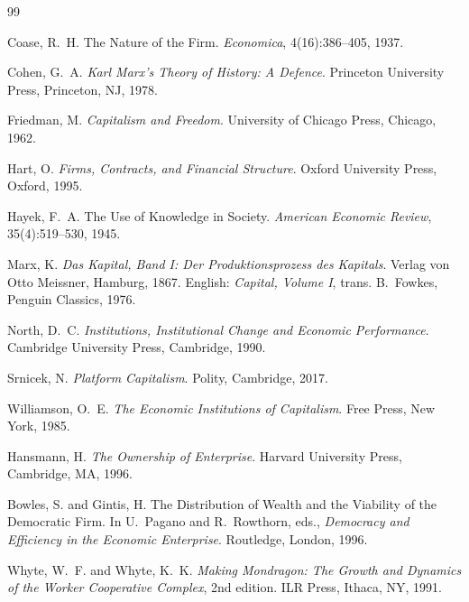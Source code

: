 \documentclass[11pt,a4paper]{article}
\theoremstyle{remark}
\begin{document}
\begin{thebibliography}{99}

Coase, R.~H.
\newblock The Nature of the Firm.
\newblock \emph{Economica}, 4(16):386--405, 1937.

Cohen, G.~A.
\newblock \emph{Karl Marx's Theory of History: A Defence}.
\newblock Princeton University Press, Princeton, NJ, 1978.

Friedman, M.
\newblock \emph{Capitalism and Freedom}.
\newblock University of Chicago Press, Chicago, 1962.

Hart, O.
\newblock \emph{Firms, Contracts, and Financial Structure}.
\newblock Oxford University Press, Oxford, 1995.

Hayek, F.~A.
\newblock The Use of Knowledge in Society.
\newblock \emph{American Economic Review}, 35(4):519--530, 1945.

Marx, K.
\newblock \emph{Das Kapital, Band I: Der Produktionsprozess des
  Kapitals}.
\newblock Verlag von Otto Meissner, Hamburg, 1867.
\newblock English: \emph{Capital, Volume I}, trans. B.~Fowkes,
  Penguin Classics, 1976.

North, D.~C.
\newblock \emph{Institutions, Institutional Change and Economic
  Performance}.
\newblock Cambridge University Press, Cambridge, 1990.

Srnicek, N.
\newblock \emph{Platform Capitalism}.
\newblock Polity, Cambridge, 2017.

Williamson, O.~E.
\newblock \emph{The Economic Institutions of Capitalism}.
\newblock Free Press, New York, 1985.

Hansmann, H.
\newblock \emph{The Ownership of Enterprise}.
\newblock Harvard University Press, Cambridge, MA, 1996.

Bowles, S. and Gintis, H.
\newblock The Distribution of Wealth and the Viability of the
  Democratic Firm.
\newblock In U.~Pagano and R.~Rowthorn, eds., \emph{Democracy and
  Efficiency in the Economic Enterprise}. Routledge, London, 1996.

Whyte, W.~F. and Whyte, K.~K.
\newblock \emph{Making Mondragon: The Growth and Dynamics of the
  Worker Cooperative Complex}, 2nd edition.
\newblock ILR Press, Ithaca, NY, 1991.


\end{thebibliography}
\end{document}
